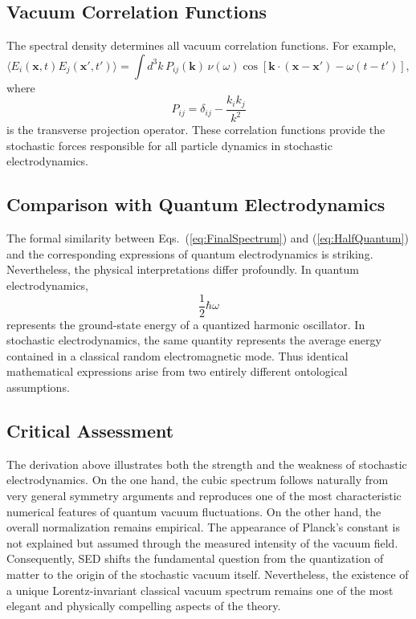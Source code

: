 \subsection{Vacuum Correlation Functions}
The spectral density determines all vacuum correlation functions.
For example,
\begin{equation}
\langle E_i(\mathbf x,t)E_j(\mathbf x',t')\rangle=
\int d^3k\,P_{ij}(\mathbf k)\,\nu(\omega)\cos
\left[\mathbf k\cdot(\mathbf x-\mathbf x')-\omega(t-t')\right],
\end{equation}
where
\[P_{ij}=\delta_{ij}-\frac{k_ik_j}{k^2}\]
is the transverse projection operator.
These correlation functions provide the stochastic forces responsible
for all particle dynamics in stochastic electrodynamics.
\subsection{Comparison with Quantum Electrodynamics}
The formal similarity between Eqs.~(\ref{eq:FinalSpectrum}) and
(\ref{eq:HalfQuantum}) and the corresponding expressions of quantum
electrodynamics is striking.
Nevertheless, the physical interpretations differ profoundly.
In quantum electrodynamics,
\[\frac12\hbar\omega\]
represents the ground-state energy of a quantized harmonic oscillator.
In stochastic electrodynamics,
the same quantity represents the average energy contained in a classical
random electromagnetic mode.
Thus identical mathematical expressions arise from two entirely
different ontological assumptions.
\subsection*{Critical Assessment}
The derivation above illustrates both the strength and the weakness of
stochastic electrodynamics.
On the one hand, the cubic spectrum follows naturally from very general
symmetry arguments and reproduces one of the most characteristic
numerical features of quantum vacuum fluctuations.
On the other hand, the overall normalization remains empirical. The
appearance of Planck's constant is not explained but assumed through the
measured intensity of the vacuum field. Consequently, SED shifts the
fundamental question from the quantization of matter to the origin of
the stochastic vacuum itself.
Nevertheless, the existence of a unique Lorentz-invariant classical
vacuum spectrum remains one of the most elegant and physically
compelling aspects of the theory.

